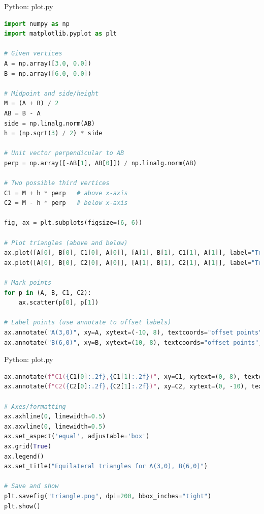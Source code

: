 \documentclass{beamer}
\numberwithin{equation}{section}
\theoremstyle{remark}
\begin{document}
\begin{frame}[fragile]{Python: plot.py}
\begin{lstlisting}[language=Python]
   import numpy as np
import matplotlib.pyplot as plt

# Given vertices
A = np.array([3.0, 0.0])
B = np.array([6.0, 0.0])

# Midpoint and side/height
M = (A + B) / 2
AB = B - A
side = np.linalg.norm(AB)
h = (np.sqrt(3) / 2) * side

# Unit vector perpendicular to AB
perp = np.array([-AB[1], AB[0]]) / np.linalg.norm(AB)

# Two possible third vertices
C1 = M + h * perp   # above x-axis
C2 = M - h * perp   # below x-axis

fig, ax = plt.subplots(figsize=(6, 6))

# Plot triangles (above and below)
ax.plot([A[0], B[0], C1[0], A[0]], [A[1], B[1], C1[1], A[1]], label="Triangle (above)")
ax.plot([A[0], B[0], C2[0], A[0]], [A[1], B[1], C2[1], A[1]], label="Triangle (below)")

# Mark points
for p in (A, B, C1, C2):
    ax.scatter(p[0], p[1])

# Label points (use annotate to offset labels)
ax.annotate("A(3,0)", xy=A, xytext=(-10, 8), textcoords="offset points", ha="right", va="bottom")
ax.annotate("B(6,0)", xy=B, xytext=(10, 8), textcoords="offset points", ha="left", va="bottom")
\end{lstlisting}
\end{frame}

\begin{frame}[fragile]{Python: plot.py}
\begin{lstlisting}[language=Python]
ax.annotate(f"C1({C1[0]:.2f},{C1[1]:.2f})", xy=C1, xytext=(0, 8), textcoords="offset points", ha="center", va="bottom")
ax.annotate(f"C2({C2[0]:.2f},{C2[1]:.2f})", xy=C2, xytext=(0, -10), textcoords="offset points", ha="center", va="top")

# Axes/formatting
ax.axhline(0, linewidth=0.5)
ax.axvline(0, linewidth=0.5)
ax.set_aspect('equal', adjustable='box')
ax.grid(True)
ax.legend()
ax.set_title("Equilateral triangles for A(3,0), B(6,0)")

# Save and show
plt.savefig("triangle.png", dpi=200, bbox_inches="tight")
plt.show()
\end{lstlisting}
\end{frame}
\end{document}
